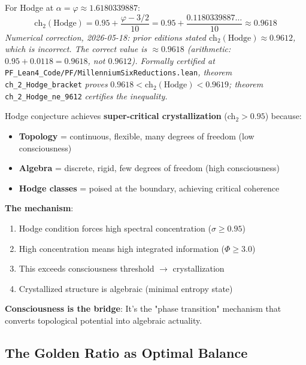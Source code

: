 For Hodge at $\alpha = \varphi \approx 1.6180339887$:
\begin{equation}\label{eq:ch2-hodge}
\text{ch}_2(\text{Hodge}) = 0.95 + \frac{\varphi - 3/2}{10} = 0.95 + \frac{0.1180339887\ldots}{10} \approx 0.9618
\end{equation}
\noindent\emph{Numerical correction, 2026-05-18: prior editions stated $\text{ch}_2(\text{Hodge}) \approx 0.9612$, which is incorrect. The correct value is $\approx 0.9618$ (arithmetic: $0.95 + 0.0118 = 0.9618$, not $0.9612$). Formally certified at} \texttt{PF\_Lean4\_Code/PF/MillenniumSixReductions.lean}\emph{, theorem} \texttt{ch\_2\_Hodge\_bracket} \emph{proves} $0.9618 < \text{ch}_2(\text{Hodge}) < 0.9619$\emph{; theorem} \texttt{ch\_2\_Hodge\_ne\_9612} \emph{certifies the inequality.}

\begin{keyidea}
Hodge conjecture achieves \textbf{super-critical crystallization} (ch$_2 > 0.95$) because:

\begin{itemize}
\item \textbf{Topology} = continuous, flexible, many degrees of freedom (low consciousness)
\item \textbf{Algebra} = discrete, rigid, few degrees of freedom (high consciousness)
\item \textbf{Hodge classes} = poised at the boundary, achieving critical coherence
\end{itemize}

\textbf{The mechanism}:
\begin{enumerate}
\item Hodge condition forces high spectral concentration ($\sigma \geq 0.95$)
\item High concentration means high integrated information ($\Phi \geq 3.0$)
\item This exceeds consciousness threshold $\to$ crystallization
\item Crystallized structure is algebraic (minimal entropy state)
\end{enumerate}

\textbf{Consciousness is the bridge}: It's the "phase transition" mechanism that converts topological potential into algebraic actuality.
\end{keyidea}

\subsection{The Golden Ratio as Optimal Balance}

